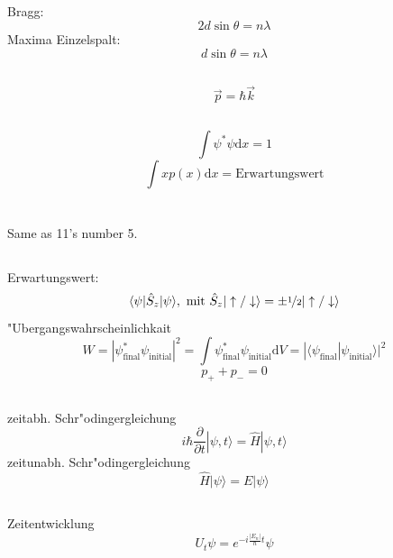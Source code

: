 \documentclass[12pt]{report}
\newcommand{\dd}{\mathrm{d}}
\begin{document}
\subsection{}
Bragg:
\[2d\sin\theta=n\lambda\]
Maxima Einzelspalt:
\[d\sin\theta=n\lambda\]

\subsection{}
\[\vec{p}=\hbar\vec{k}\]

\subsection{}
\[\int\psi^*\psi\dd x=1\]
\[\int x p(x)\dd x=\textrm{Erwartungswert}\]

\section{}

\subsection{}

Same as 11's number 5.

\subsection{}

Erwartungswert: 
\[\langle\psi|\hat{S}_z|\psi\rangle,\ \textrm{mit }\hat{S}_z|\uparrow/\downarrow\rangle=\pm\nicefrac{1}{2}|\uparrow/\downarrow\rangle\]
"Ubergangswahrscheinlichkait
\[W=|\psi^*_\mathrm{final}\psi_\mathrm{initial}|^2=\int\psi^*_\mathrm{final}\psi_\mathrm{initial}\dd V=|\langle\psi_\mathrm{final}|\psi_\mathrm{initial}\rangle|^2\]
\[p_++p_-=0\]

\subsection{}

zeitabh. Schr"odingergleichung
\[i\hbar\frac{\partial}{\partial t}|\psi,t\rangle=\hat{H}|\psi,t\rangle\]
zeitunabh. Schr"odingergleichung
\[\hat{H}|\psi\rangle=E|\psi\rangle\]

\subsection{}

Zeitentwicklung
\[U_t\psi=e^{-i\frac{|E_n|}{\hbar}t}\psi\]
\end{document}
